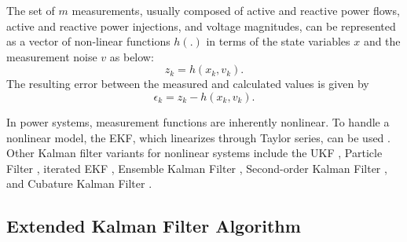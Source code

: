The set of $m$ measurements, usually composed of active and reactive power flows, active and reactive power injections, and voltage magnitudes, can be represented as a vector of non-linear functions $h(.)$ in terms of the state variables $x$ and the measurement noise $v$ as below:
\begin{equation}
    z_{k}=h\left(x_{k}, v_{k}\right).
\end{equation}
The resulting error between the measured and calculated values is given by
\begin{equation}
    \epsilon_{k}=z_{k}-h\left(x_{k}, v_{k}\right).
\end{equation}

In power systems, measurement functions are inherently nonlinear. To handle a nonlinear model, the EKF, which linearizes through Taylor series, can be used \autocite{Jin_2021}. Other Kalman filter variants for nonlinear systems include the UKF \autocite{Valverde2011}, Particle Filter \autocite{DELMORAL1997653}, iterated EKF \autocite{BRETAS198970}, Ensemble Kalman Filter \autocite{Houtekamer_Mitchell_1998}, Second-order Kalman Filter \autocite{Nash_Gelb_Kasper_1974}, and Cubature Kalman Filter \autocite{BASETTI2022100712}.

\subsection{Extended Kalman Filter Algorithm}\label{sec:ch1/sec5/sub1}

